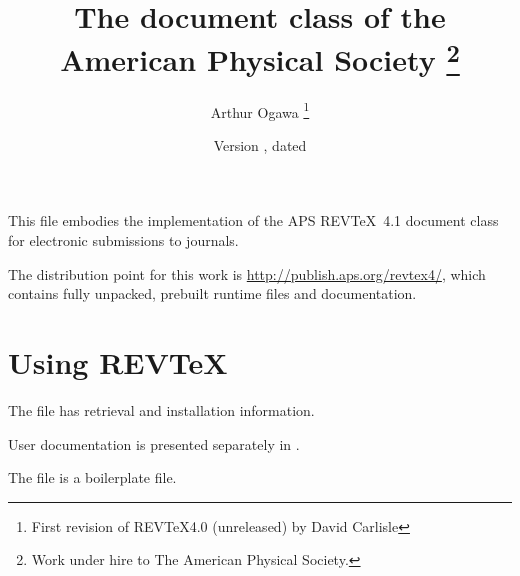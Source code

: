 \title{%
 The  document class of the American Physical Society%
 \protect\thanks{Work under hire to The American Physical Society.}%
}%
\author{Arthur Ogawa%
 \protect\thanks{First revision of REV\TeX4.0 (unreleased) by David Carlisle}%
}%
\date{Version \fileversion, dated \filedate}%
\newcommand\revtex{REV\TeX}

\maketitle

This file embodies the implementation of the APS \revtex\ 4.1 document class
for electronic submissions to journals.

The distribution point for this work is
\url{http://publish.aps.org/revtex4/},
which contains fully unpacked, prebuilt runtime files and documentation.

\tableofcontents

\section{Using \protect\revtex}

The file  has retrieval and installation information.

User documentation is presented separately in .

The file  is a boilerplate file.

